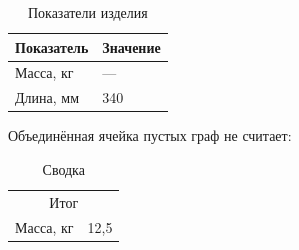 \begin{table}
  \caption{Показатели изделия}
  \begin{tabular}{ll}
    \hline
    Показатель & Значение \\
    \hline
    Масса, кг & — \\
    Длина, мм & 340 \\
    \hline
  \end{tabular}
\end{table}

Объединённая ячейка пустых граф не считает:

\begin{table}
  \caption{Сводка}
  \begin{tabular}{ll}
    \hline
    \multicolumn{2}{c}{Итог} \\
    Масса, кг & 12,5 \\
    \hline
  \end{tabular}
\end{table}
